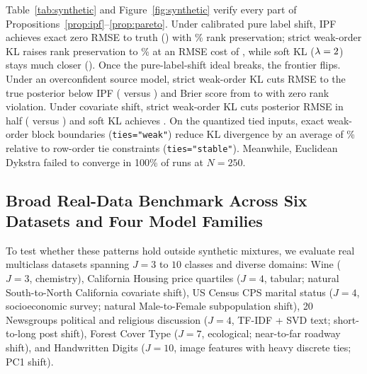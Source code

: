 \documentclass[11pt]{article}
\begin{document}
Table~\ref{tab:synthetic} and Figure~\ref{fig:synthetic} verify every part of Propositions~\ref{prop:ipf}--\ref{prop:pareto}. Under calibrated pure label shift, IPF achieves exact zero RMSE to truth (\SynPureIpfRmse{}) with \SynPureIpfRank{}\% rank preservation; strict weak-order KL raises rank preservation to \SynPureKlWeakRank{}\% at an RMSE cost of \SynPureKlWeakRmse{}, while soft KL ($\lambda=2$) stays much closer (\SynPureKlSoftRmse{}). Once the pure-label-shift ideal breaks, the frontier flips. Under an overconfident source model, strict weak-order KL cuts RMSE to the true posterior below IPF (\SynOverKlWeakRmse{} versus \SynOverIpfRmse{}) and Brier score from \SynOverIpfBrier{} to \SynOverKlWeakBrier{} with zero rank violation. Under covariate shift, strict weak-order KL cuts posterior RMSE in half (\SynCovKlWeakRmse{} versus \SynCovIpfRmse{}) and soft KL achieves \SynCovKlSoftRmse{}. On the quantized tied inputs, exact weak-order block boundaries (\texttt{ties="weak"}) reduce KL divergence by an average of \TieKlDropPct\% relative to row-order tie constraints (\texttt{ties="stable"}). Meanwhile, Euclidean Dykstra failed to converge in 100\% of runs at $N=250$.

\subsection{Broad Real-Data Benchmark Across Six Datasets and Four Model Families}

To test whether these patterns hold outside synthetic mixtures, we evaluate \NumDatasets{} real multiclass datasets spanning $J=3$ to $10$ classes and diverse domains: Wine ($J=3$, chemistry), California Housing price quartiles ($J=4$, tabular; natural South-to-North California covariate shift), US Census CPS marital status ($J=4$, socioeconomic survey; natural Male-to-Female subpopulation shift), 20 Newsgroups political and religious discussion ($J=4$, TF-IDF + SVD text; short-to-long post shift), Forest Cover Type ($J=7$, ecological; near-to-far roadway shift), and Handwritten Digits ($J=10$, image features with heavy discrete ties; PC1 shift).
\end{document}
